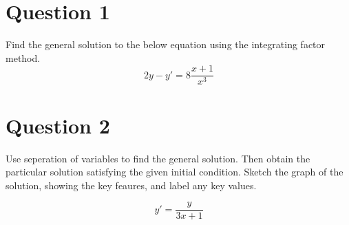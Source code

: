 \documentclass{article}
\begin{document}
\section*{Question 1}

Find the general solution to the below equation using the integrating factor
method.
$$2y - y' = 8 \frac{x+1}{x^3}$$

\section*{Question 2}

Use seperation of variables to find the general solution. Then
obtain the particular solution satisfying the given initial condition.
Sketch the graph of the solution, showing the key feaures, and label any
key values.

$$y' = \frac{y}{3x+1}$$
\end{document}
